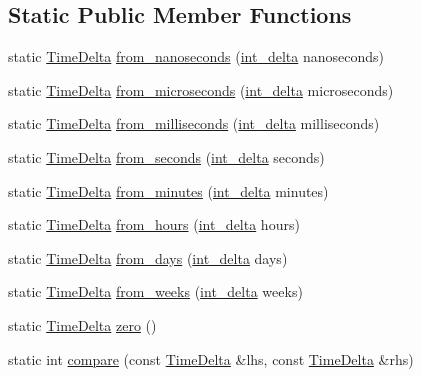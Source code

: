 \subsection*{\-Static \-Public \-Member \-Functions}
\begin{DoxyCompactItemize}
\item 
static \hyperlink{structTimeDelta}{\-Time\-Delta} \hyperlink{structTimeDelta_abc1b517c2156b2d9627fd07d42aecb2f}{from\-\_\-nanoseconds} (\hyperlink{types_8h_a8a67cf99971c5cfeeaa2380ba84a4c92}{int\-\_\-delta} nanoseconds)
\item 
static \hyperlink{structTimeDelta}{\-Time\-Delta} \hyperlink{structTimeDelta_a32f3fa21ba37d81507383d001f3b704b}{from\-\_\-microseconds} (\hyperlink{types_8h_a8a67cf99971c5cfeeaa2380ba84a4c92}{int\-\_\-delta} microseconds)
\item 
static \hyperlink{structTimeDelta}{\-Time\-Delta} \hyperlink{structTimeDelta_a01e0919f444379030aa37559fa13542c}{from\-\_\-milliseconds} (\hyperlink{types_8h_a8a67cf99971c5cfeeaa2380ba84a4c92}{int\-\_\-delta} milliseconds)
\item 
static \hyperlink{structTimeDelta}{\-Time\-Delta} \hyperlink{structTimeDelta_aad4311d8580ade36d8c567576630c967}{from\-\_\-seconds} (\hyperlink{types_8h_a8a67cf99971c5cfeeaa2380ba84a4c92}{int\-\_\-delta} seconds)
\item 
static \hyperlink{structTimeDelta}{\-Time\-Delta} \hyperlink{structTimeDelta_a244bc3b143bfa760aa2b0cf350cf768c}{from\-\_\-minutes} (\hyperlink{types_8h_a8a67cf99971c5cfeeaa2380ba84a4c92}{int\-\_\-delta} minutes)
\item 
static \hyperlink{structTimeDelta}{\-Time\-Delta} \hyperlink{structTimeDelta_a912f6ceafac4b9252a1a5d76033754ea}{from\-\_\-hours} (\hyperlink{types_8h_a8a67cf99971c5cfeeaa2380ba84a4c92}{int\-\_\-delta} hours)
\item 
static \hyperlink{structTimeDelta}{\-Time\-Delta} \hyperlink{structTimeDelta_a9bb1a85b6f27ad8488ae06e238d5808e}{from\-\_\-days} (\hyperlink{types_8h_a8a67cf99971c5cfeeaa2380ba84a4c92}{int\-\_\-delta} days)
\item 
static \hyperlink{structTimeDelta}{\-Time\-Delta} \hyperlink{structTimeDelta_ae0f0a41d899e62b9d17bc4542c443ec6}{from\-\_\-weeks} (\hyperlink{types_8h_a8a67cf99971c5cfeeaa2380ba84a4c92}{int\-\_\-delta} weeks)
\item 
static \hyperlink{structTimeDelta}{\-Time\-Delta} \hyperlink{structTimeDelta_a2dec837a107c5e46e14b9c69557209fa}{zero} ()
\item 
static int \hyperlink{structTimeDelta_a1bee789870de5a374ee472ffa4bff172}{compare} (const \hyperlink{structTimeDelta}{\-Time\-Delta} \&lhs, const \hyperlink{structTimeDelta}{\-Time\-Delta} \&rhs)
\end{DoxyCompactItemize}
